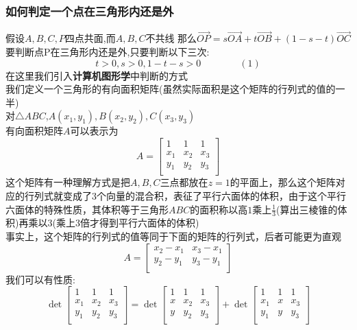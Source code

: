 \documentclass{article}
\begin{document}
\begin{CJK}{UTF8}{gkai}
\subsubsection*{如何判定一个点在三角形内还是外}
假设$A,B,C,P$四点共面,而$A,B,C$不共线
那么$\overrightarrow{OP}=s\overrightarrow{OA}+t\overrightarrow{OB}+(1-s-t)\overrightarrow{OC}$\\
要判断点P在三角形内还是外,只要判断以下三次:\\
\[t>0,s>0,1-t-s>0\quad\quad\quad\quad(1)\]
在这里我们引入\textbf{计算机图形学}中判断的方式\\
我们定义一个三角形的有向面积矩阵(虽然实际面积是这个矩阵的行列式的值的一半)\\
对$\triangle ABC$,$A(x_1,y_1),B(x_2,y_2),C(x_3,y_3)$\\
有向面积矩阵$A$可以表示为
\[A=\begin{bmatrix}
    1&1&1\\
    x_1&x_2&x_3\\
    y_1&y_2&y_3\\
\end{bmatrix}\]
这个矩阵有一种理解方式是把$A,B,C$三点都放在$z=1$的平面上，那么这个矩阵对应的行列式就变成了3个向量的混合积，表征了平行六面体的体积，由于这个平行六面体的特殊性质，其体积等于三角形$ABC$的面积称以高$1$乘上$\frac{1}{3}$(算出三棱锥的体积)再乘以$3$(乘上3倍才得到平行六面体的体积)\\
事实上，这个矩阵的行列式的值等同于下面的矩阵的行列式，后者可能更为直观\\
\[A=\begin{bmatrix}
    x_2-x_1&x_3-x_1\\
    y_2-y_1&y_3-y_1\\
\end{bmatrix}\]
我们可以有性质:\\
\[
\det\begin{bmatrix}
    1&1&1\\
    x_1&x_2&x_3\\
    y_1&y_2&y_3\\
\end{bmatrix}
=\det
\begin{bmatrix}
    1&1&1\\
    x&x_2&x_3\\
    y&y_2&y_3\\
\end{bmatrix}
+\det
\begin{bmatrix}
    1&1&1\\
    x_1&x&x_3\\
    y_1&y&y_3\\

\end{bmatrix}\]
\end{CJK}
\end{document}

